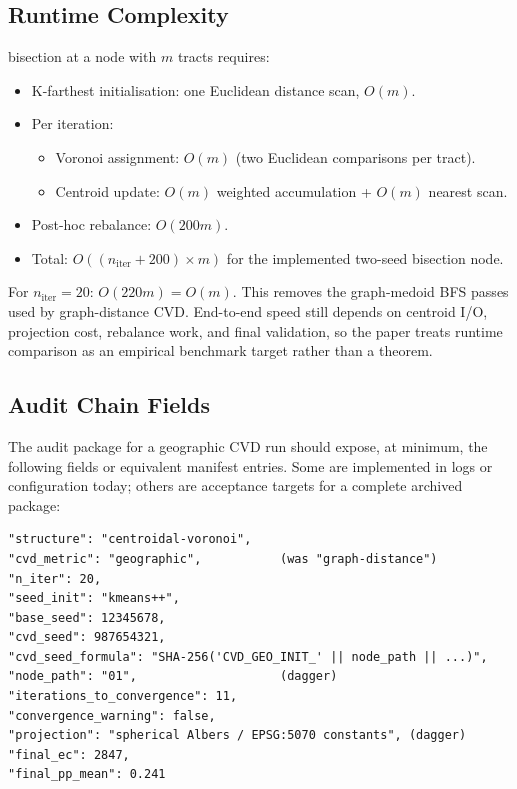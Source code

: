 \subsection{Runtime Complexity}

\begin{proposition}
\label{prop:geo-runtime}
\cvdgeo{} bisection at a node with $m$ tracts requires:
\begin{itemize}
\item K-farthest initialisation: one Euclidean distance scan, $O(m)$.
\item Per iteration:
  \begin{itemize}
  \item Voronoi assignment: $O(m)$ (two Euclidean comparisons per tract).
  \item Centroid update: $O(m)$ weighted accumulation + $O(m)$ nearest scan.
  \end{itemize}
\item Post-hoc rebalance: $O(200 m)$.
\item Total: $O((n_{\mathrm{iter}} + 200) \times m)$ for the implemented
  two-seed bisection node.
\end{itemize}
For $n_{\mathrm{iter}} = 20$: $O(220m) = O(m)$.
This removes the graph-medoid BFS passes used by graph-distance CVD. End-to-end
speed still depends on centroid I/O, projection cost, rebalance work, and final
validation, so the paper treats runtime comparison as an empirical benchmark
target rather than a theorem.
\end{proposition}

\subsection{Audit Chain Fields}
\label{subsec:audit}

The audit package for a geographic CVD run should expose, at minimum, the
following fields or equivalent manifest entries. Some are implemented in logs
or configuration today; others are acceptance targets for a complete archived
package:

\begin{verbatim}
"structure": "centroidal-voronoi",
"cvd_metric": "geographic",           (was "graph-distance")
"n_iter": 20,
"seed_init": "kmeans++",
"base_seed": 12345678,
"cvd_seed": 987654321,
"cvd_seed_formula": "SHA-256('CVD_GEO_INIT_' || node_path || ...)",
"node_path": "01",                    (dagger)
"iterations_to_convergence": 11,
"convergence_warning": false,
"projection": "spherical Albers / EPSG:5070 constants", (dagger)
"final_ec": 2847,
"final_pp_mean": 0.241
\end{verbatim}

